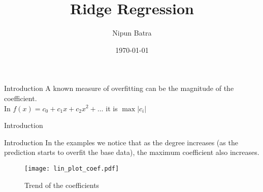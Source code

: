 \documentclass{beamer}
\title{Ridge Regression}
\date{\today}
\author{Nipun Batra}
\institute{IIT Gandhinagar}
\begin{document}
  \maketitle

\begin{frame}{Introduction}
A known measure of overfitting can be the magnitude of the coefficient. \\ \bigskip
\pause
In $f(x) = c_0 + c_1x + c_2x^2 + \dots$ it is $\max|c_i|$ \\ \bigskip
\end{frame}
  
\begin{frame}{Introduction}
\vspace{0.4cm}
\end{frame}  

\begin{frame}{Introduction}
\vspace{0.4cm}
In the examples we notice that as the degree increases (as the prediction starts to overfit the base data), the maximum coefficient also increases.
\begin{figure}\texttt{[image: lin\_plot\_coef.pdf]}\caption{Trend of the coefficients}\end{figure}

\end{frame}
 
\end{document}
